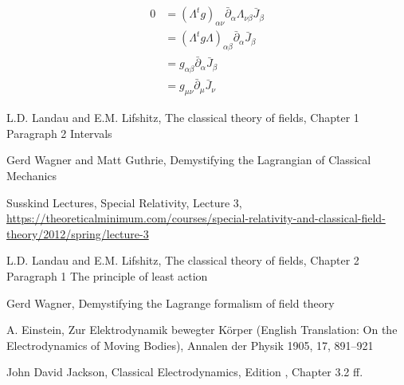 \documentclass{article}
\begin{document}
\begin{align}
    0 & = (\Lambda^t g )_{\alpha\nu} \bar{\partial}_\alpha  \Lambda_{\nu\beta} \bar{J}_\beta \nonumber \\
      & = (\Lambda^t g \Lambda)_{\alpha\beta} \bar{\partial}_\alpha  \bar{J}_\beta \nonumber \\
      & = g_{\alpha\beta} \bar{\partial}_\alpha  \bar{J}_\beta \nonumber \\
      & = g_{\mu\nu} \bar{\partial}_\mu  \bar{J}_\nu \nonumber
\end{align}


\begin{thebibliography}{9}

 L.D. Landau and E.M. Lifshitz, The classical theory of fields, Chapter 1 Paragraph 2 Intervals

 Gerd Wagner and Matt Guthrie, Demystifying the Lagrangian of Classical Mechanics

 Susskind Lectures, Special Relativity, Lecture 3, \url{https://theoreticalminimum.com/courses/special-relativity-and-classical-field-theory/2012/spring/lecture-3}

 L.D. Landau and E.M. Lifshitz, The classical theory of fields, Chapter 2 Paragraph 1 The principle of least action

 Gerd Wagner, Demystifying the Lagrange formalism of field theory

 A. Einstein, Zur Elektrodynamik bewegter K\"{o}rper (English Translation: On the Electrodynamics of Moving Bodies), Annalen der Physik 1905, 17, 891--921

 John David Jackson, Classical Electrodynamics, Edition , Chapter 3.2 ff.

\end{thebibliography}
\end{document}
